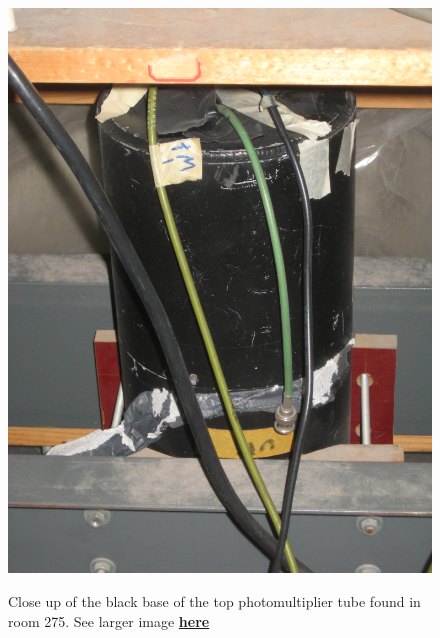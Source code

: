 \documentclass{../lab}
\begin{document}
\begin{figure}[h]
\begin{minipage}{0.20\textwidth}
    \href{http://experimentationlab.berkeley.edu/sites/default/files/images/MUO_PMT_3563.jpg}{\includegraphics[width=\linewidth,keepaspectratio]{images/MUO_PMT_3563.jpg}}
    \caption{Close up of the black base of the top photomultiplier tube found in room 275. See larger image \href{http://experimentationlab.berkeley.edu/sites/default/files/images/MUO_PMT_3563.jpg}{\textbf{here}}}
\end{minipage}
\begin{minipage}{0.33\textwidth}

\end{minipage}
\end{figure}
\end{document}
